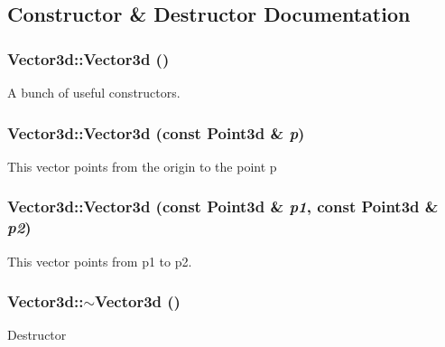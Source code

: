 \subsection{Constructor \& Destructor Documentation}
\hypertarget{classCartWheel_1_1Math_1_1Vector3d_aac098d8695c4288e4844835e62945244}{
\subsubsection[{Vector3d}]{\setlength{\rightskip}{0pt plus 5cm}Vector3d::Vector3d ()}}
\label{classCartWheel_1_1Math_1_1Vector3d_aac098d8695c4288e4844835e62945244}
A bunch of useful constructors. \hypertarget{classCartWheel_1_1Math_1_1Vector3d_a17c21f1f773476888dfe0c370469428f}{
\subsubsection[{Vector3d}]{\setlength{\rightskip}{0pt plus 5cm}Vector3d::Vector3d (const {\bf Point3d} \& {\em p})}}
\label{classCartWheel_1_1Math_1_1Vector3d_a17c21f1f773476888dfe0c370469428f}
This vector points from the origin to the point p \hypertarget{classCartWheel_1_1Math_1_1Vector3d_a56c32bfaec62092b7c62df53a7516110}{
\subsubsection[{Vector3d}]{\setlength{\rightskip}{0pt plus 5cm}Vector3d::Vector3d (const {\bf Point3d} \& {\em p1}, \/  const {\bf Point3d} \& {\em p2})}}
\label{classCartWheel_1_1Math_1_1Vector3d_a56c32bfaec62092b7c62df53a7516110}
This vector points from p1 to p2. \hypertarget{classCartWheel_1_1Math_1_1Vector3d_ab0d497b2a1ee352d181b22986f4b258b}{
\subsubsection[{$\sim$Vector3d}]{\setlength{\rightskip}{0pt plus 5cm}Vector3d::$\sim$Vector3d ()}}
\label{classCartWheel_1_1Math_1_1Vector3d_ab0d497b2a1ee352d181b22986f4b258b}
Destructor 

